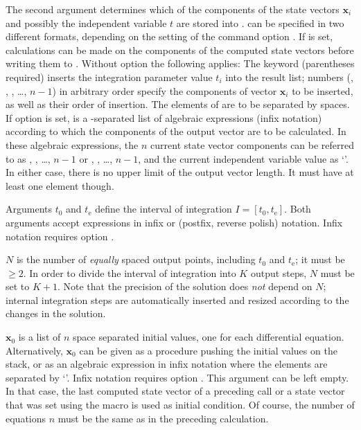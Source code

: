 \documentclass[11pt,english,BCOR10mm,DIV12,bibliography=totoc,parskip=false,smallheadings
    headexclude,footexclude,oneside,dvips]{pst-doc}
\begin{document}
The second argument  determines which of the components of the state vectors $\mathbf{x}_i$ and possibly the independent variable $t$ are stored into .  can be specified in two different formats, depending on the setting of the command option .
If  is set, calculations can be made on the components of the computed state vectors before writing them to . Without option  the following applies: The keyword  (parentheses required) inserts the integration parameter value $t_i$ into the result list; numbers (, , , \dots, $n-1$) in arbitrary order specify the components of vector $\mathbf{x}_i$ to be inserted, as well as their order of insertion. The elements of  are to be separated by spaces. If option  is set,  is a \Lkeyword{|}-separated list of algebraic expressions (infix notation) according to which the components of the output vector are to be calculated. In these algebraic expressions, the $n$ current state vector components can be referred to as , , \dots, \Lkeyword{x[}$n-1$\Lkeyword{]} or , , \dots, \Lkeyword{y[}$n-1$\Lkeyword{]}, and the current independent variable value as `'. In either case, there is no upper limit of the output vector length. It must have at least one element though.

Arguments $t_0$ and $t_\mathrm{e}$ define the interval of integration $I=[t_0, t_\mathrm{e}]$. Both arguments accept expressions in infix or \PS{} (postfix, reverse polish) notation. Infix notation requires option .

$N$ is the number of \emph{equally} spaced output points, including $t_0$ and $t_\mathrm{e}$; it must be $\ge 2$. In order to divide the interval of integration into $K$ output steps, $N$ must be set to $K+1$. Note that the precision of the solution does \emph{not} depend on $N$; internal integration steps are automatically inserted and resized according to the changes in the solution.

$\mathbf{x}_0$ is a list of $n$ space separated initial values, one for each differential equation. Alternatively, $\mathbf{x}_0$ can be given as a \PS{} procedure pushing the initial values on the stack, or as an algebraic expression in infix notation where the elements are separated by `\Lkeyword{|}'. Infix notation requires option . This argument can be left empty. In that case, the last computed state vector of a preceding  call or a state vector that was set using the  macro is used as initial condition. Of course, the number of equations $n$ must be the same as in the preceding calculation.
\end{document}
